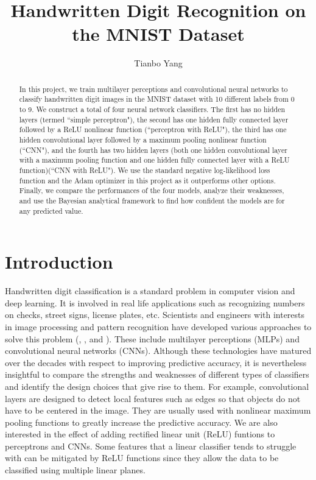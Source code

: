 \documentclass[11pt]{amsart}
\begin{document}
\title{Handwritten Digit Recognition on the MNIST Dataset}
\author{Tianbo Yang}

\begin{abstract}
In this project, we train multilayer perceptions and convolutional neural networks to classify handwritten digit images in the MNIST dataset with 10 different labels from 0 to 9. We construct a total of four neural network classifiers. The first has no hidden layers (termed ``simple perceptron"), the second has one hidden fully connected layer followed by a ReLU nonlinear function (``perceptron with ReLU"), the third has one hidden convolutional layer followed by a maximum pooling nonlinear function (``CNN"), and the fourth has two hidden layers (both one hidden convolutional layer with a maximum pooling function and one hidden fully connected layer with a ReLU function)(``CNN with ReLU"). We use the standard negative log-likelihood loss function and the Adam optimizer in this project as it outperforms other options. Finally, we compare the performances of the four models, analyze their weaknesses, and use the Bayesian analytical framework to find how confident the models are for any predicted value.
\end{abstract}

\maketitle

\vspace{-0.2in}

\section{Introduction}

Handwritten digit classification is a standard problem in computer vision and deep learning. It is involved in real life applications such as recognizing numbers on checks, street signs, license plates, etc. Scientists and engineers with interests in image processing and pattern recognition have developed various approaches to solve this problem (\cite{CMGS}, \cite{DC}, and \cite{HZ}). These include multilayer perceptions (MLPs) and convolutional neural networks (CNNs). Although these technologies have matured over the decades with respect to improving predictive accuracy, it is nevertheless insightful to compare the strengths and weaknesses of different types of classifiers and identify the design choices that give rise to them. For example, convolutional layers are designed to detect local features such as edges so that objects do not have to be centered in the image. They are usually used with nonlinear maximum pooling functions to greatly increase the predictive accuracy. We are also interested in the effect of adding rectified linear unit (ReLU) funtions to perceptrons and CNNs. Some features that a linear classifier tends to struggle with can be mitigated by ReLU functions since they allow the data to be classified using multiple linear planes.
\end{document}
